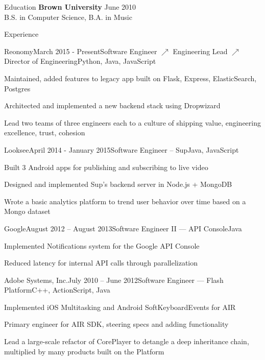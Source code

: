 \documentclass{resume} %
\begin{document}
\begin{rSection}{Education}
{\bf Brown University} \hfill {June 2010} \\ 
B.S. in Computer Science, B.A. in Music
\end{rSection}

\begin{rSection}{Experience}

\begin{rSubsection}{Reonomy}{March 2015 - Present}{Software Engineer $\nearrow$ Engineering Lead $\nearrow$ Director of Engineering}{Python, Java, JavaScript}
\item Maintained, added features to legacy app built on Flask, Express, ElasticSearch, Postgres
\item Architected and implemented a new backend stack using Dropwizard
\item Lead two teams of three engineers each to a culture of shipping value, engineering excellence, trust, cohesion
\end{rSubsection}
\begin{rSubsection}{Looksee}{April 2014 - January 2015}{Software Engineer -- Sup}{Java, JavaScript}
\item Built 3 Android apps for publishing and subscribing to live video
\item Designed and implemented Sup's backend server in Node.js + MongoDB
\item Wrote a basic analytics platform to trend user behavior over time based on a Mongo dataset
\end{rSubsection}
\begin{rSubsection}{Google}{August 2012 -- August 2013}{Software Engineer II --- API Console}{Java}
\item Implemented Notifications system for the Google API Console
\item Reduced latency for internal API calls through parallelization
\end{rSubsection}
\begin{rSubsection}{Adobe Systems, Inc.}{July 2010 -- June 2012}{Software Engineer --- Flash Platform}{C++, ActionScript, Java}
\item Implemented iOS Multitasking and Android SoftKeyboardEvents for AIR
\item Primary engineer for AIR SDK, steering specs and adding functionality
\item Lead a large-scale refactor of CorePlayer to detangle a deep inheritance
    chain, multiplied by many products built on the Platform
\end{rSubsection}
\end{rSection}
\end{document}
